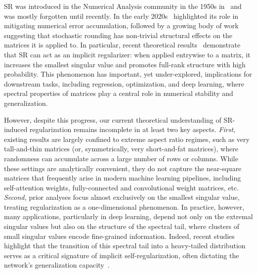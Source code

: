 \documentclass{article}
\begin{document}
SR was introduced in the Numerical Analysis community in the 1950s in~\cite{forsythe1959rounding,vonneumann1947numerical} and was mostly forgotten until recently. In the early 2020s~\citep{ipsen2020probabilistic,connolly2021stochastic} highlighted its role in mitigating numerical error accumulation, followed by a growing body of work suggesting that stochastic rounding has non-trivial structural effects on the matrices it is applied to. In particular, recent theoretical results~\citep{dexter2025stochastic} demonstrate that SR can act as an implicit regularizer: when applied entrywise to a matrix, it increases the smallest singular value and promotes full-rank structure with high probability. This phenomenon has important, yet under-explored, implications for downstream tasks, including regression, optimization, and deep learning, where spectral properties of matrices play a central role in numerical stability and generalization.

However, despite this progress, our current theoretical understanding of SR-induced regularization remains incomplete in at least two key aspects. \textit{First,} existing results are largely confined to extreme aspect ratio regimes, such as very tall-and-thin matrices (or, symmetrically, very short-and-fat matrices), where randomness can accumulate across a large number of rows or columns. While these settings are analytically convenient, they do not capture the near-square matrices that frequently arise in modern machine learning pipelines, including self-attention weights, fully-connected and convolutional weight matrices, etc.
%
\textit{Second,} prior analyses focus almost exclusively on the smallest singular value, treating regularization as a one-dimensional phenomenon. In practice, however, many applications, particularly in deep learning, depend not only on the extremal singular values but also on the structure of the spectral tail, where clusters of small singular values encode fine-grained information. Indeed, recent studies highlight that the transition of this spectral tail into a heavy-tailed distribution serves as a critical signature of implicit self-regularization, often dictating the network's generalization capacity~\citep{mahoney2019traditional,martin2021implicit,martin2021predicting,he2026alphadecay}.
\end{document}
